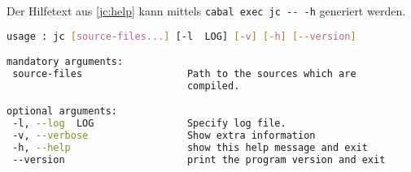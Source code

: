 Der Hilfetext aus \autoref{jc:help} kann mittels \lstinline{cabal exec jc -- -h}
generiert werden.

\begin{lstlisting}[label={jc:help}, caption={Hilfe jc}, language=bash]
usage : jc [source-files...] [-l  LOG] [-v] [-h] [--version]

mandatory arguments:
 source-files                  Path to the sources which are
                               compiled.

optional arguments:
 -l, --log  LOG                Specify log file.
 -v, --verbose                 Show extra information
 -h, --help                    show this help message and exit
 --version                     print the program version and exit
\end{lstlisting}
